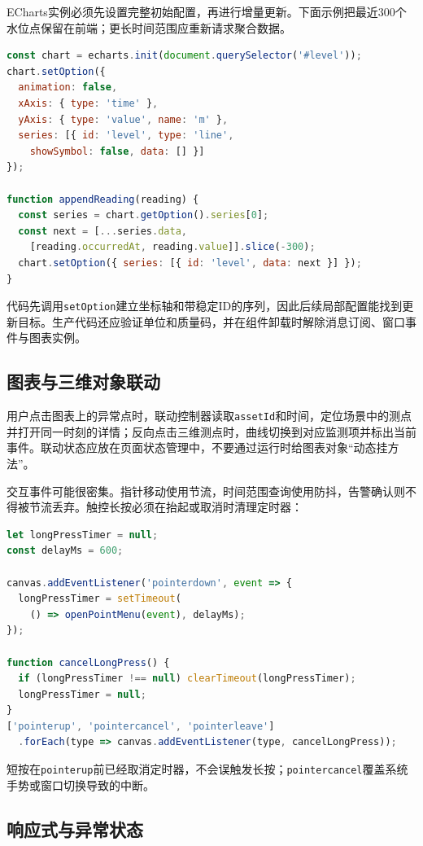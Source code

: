 ECharts实例必须先设置完整初始配置，再进行增量更新。下面示例把最近300个水位点保留在前端；更长时间范围应重新请求聚合数据。

\begin{lstlisting}[language=JavaScript,breaklines=true]
const chart = echarts.init(document.querySelector('#level'));
chart.setOption({
  animation: false,
  xAxis: { type: 'time' },
  yAxis: { type: 'value', name: 'm' },
  series: [{ id: 'level', type: 'line',
    showSymbol: false, data: [] }]
});

function appendReading(reading) {
  const series = chart.getOption().series[0];
  const next = [...series.data,
    [reading.occurredAt, reading.value]].slice(-300);
  chart.setOption({ series: [{ id: 'level', data: next }] });
}
\end{lstlisting}

代码先调用\texttt{setOption}建立坐标轴和带稳定ID的序列，因此后续局部配置能找到更新目标。生产代码还应验证单位和质量码，并在组件卸载时解除消息订阅、窗口事件与图表实例。

\subsection{图表与三维对象联动}

用户点击图表上的异常点时，联动控制器读取\texttt{assetId}和时间，定位场景中的测点并打开同一时刻的详情；反向点击三维测点时，曲线切换到对应监测项并标出当前事件。联动状态应放在页面状态管理中，不要通过运行时给图表对象“动态挂方法”。

交互事件可能很密集。指针移动使用节流，时间范围查询使用防抖，告警确认则不得被节流丢弃。触控长按必须在抬起或取消时清理定时器：

\begin{lstlisting}[language=JavaScript]
let longPressTimer = null;
const delayMs = 600;

canvas.addEventListener('pointerdown', event => {
  longPressTimer = setTimeout(
    () => openPointMenu(event), delayMs);
});

function cancelLongPress() {
  if (longPressTimer !== null) clearTimeout(longPressTimer);
  longPressTimer = null;
}
['pointerup', 'pointercancel', 'pointerleave']
  .forEach(type => canvas.addEventListener(type, cancelLongPress));
\end{lstlisting}

短按在\texttt{pointerup}前已经取消定时器，不会误触发长按；\texttt{pointercancel}覆盖系统手势或窗口切换导致的中断。

\subsection{响应式与异常状态}

